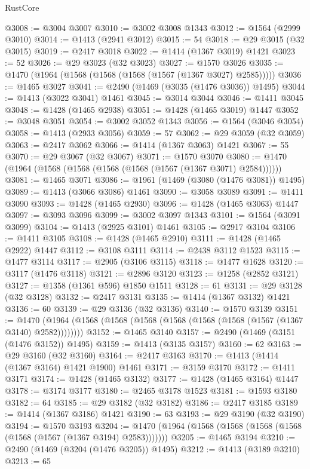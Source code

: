\begin{lexlean}{RustCore}
\begin{coremodule}
@3008 := @3004 @3007
@3010 := @3002 @3008 @1343
@3012 := @1564 (@2999 @3010)
@3014 := @1413 (@2941 @3012)
@3015 := 54
@3018 := @29 @3015 (@32 @3015)
@3019 := @2417 @3018
@3022 := @1414 (@1367 @3019) @1421
@3023 := 52
@3026 := @29 @3023 (@32 @3023)
@3027 := @1570 @3026
@3035 := @1470 (@1964 (@1568 (@1568 (@1568 (@1567 (@1367 @3027) @2585)))))
@3036 := @1465 @3027
@3041 := @2490 (@1469 (@3035 (@1476 @3036)) @1495)
@3044 := @1413 (@3022 @3041) @1461
@3045 := @3014 @3044
@3046 := @1411 @3045
@3048 := @1428 (@1465 @2938)
@3051 := @1428 (@1465 @3019) @1447
@3052 := @3048 @3051
@3054 := @3002 @3052 @1343
@3056 := @1564 (@3046 @3054)
@3058 := @1413 (@2933 @3056)
@3059 := 57
@3062 := @29 @3059 (@32 @3059)
@3063 := @2417 @3062
@3066 := @1414 (@1367 @3063) @1421
@3067 := 55
@3070 := @29 @3067 (@32 @3067)
@3071 := @1570 @3070
@3080 := @1470 (@1964 (@1568 (@1568 (@1568 (@1568 (@1567 (@1367 @3071) @2584))))))
@3081 := @1465 @3071
@3086 := @1961 (@1469 (@3080 (@1476 @3081)) @1495)
@3089 := @1413 (@3066 @3086) @1461
@3090 := @3058 @3089
@3091 := @1411 @3090
@3093 := @1428 (@1465 @2930)
@3096 := @1428 (@1465 @3063) @1447
@3097 := @3093 @3096
@3099 := @3002 @3097 @1343
@3101 := @1564 (@3091 @3099)
@3104 := @1413 (@2925 @3101) @1461
@3105 := @2917 @3104
@3106 := @1411 @3105
@3108 := @1428 (@1465 @2910)
@3111 := @1428 (@1465 @2922) @1447
@3112 := @3108 @3111
@3114 := @2438 @3112 @1523
@3115 := @1477 @3114
@3117 := @2905 (@3106 @3115)
@3118 := @1477 @1628
@3120 := @3117 (@1476 @3118)
@3121 := @2896 @3120
@3123 := @1258 (@2852 @3121)
@3127 := @1358 (@1361 @596) @1850 @1511
@3128 := 61
@3131 := @29 @3128 (@32 @3128)
@3132 := @2417 @3131
@3135 := @1414 (@1367 @3132) @1421
@3136 := 60
@3139 := @29 @3136 (@32 @3136)
@3140 := @1570 @3139
@3151 := @1470 (@1964 (@1568 (@1568 (@1568 (@1568 (@1568 (@1568 (@1567 (@1367 @3140) @2582))))))))
@3152 := @1465 @3140
@3157 := @2490 (@1469 (@3151 (@1476 @3152)) @1495)
@3159 := @1413 (@3135 @3157)
@3160 := 62
@3163 := @29 @3160 (@32 @3160)
@3164 := @2417 @3163
@3170 := @1413 (@1414 (@1367 @3164) @1421 @1900) @1461
@3171 := @3159 @3170
@3172 := @1411 @3171
@3174 := @1428 (@1465 @3132)
@3177 := @1428 (@1465 @3164) @1447
@3178 := @3174 @3177
@3180 := @2465 @3178 @1523
@3181 := @1593 @3180
@3182 := 64
@3185 := @29 @3182 (@32 @3182)
@3186 := @2417 @3185
@3189 := @1414 (@1367 @3186) @1421
@3190 := 63
@3193 := @29 @3190 (@32 @3190)
@3194 := @1570 @3193
@3204 := @1470 (@1964 (@1568 (@1568 (@1568 (@1568 (@1568 (@1567 (@1367 @3194) @2583)))))))
@3205 := @1465 @3194
@3210 := @2490 (@1469 (@3204 (@1476 @3205)) @1495)
@3212 := @1413 (@3189 @3210)
@3213 := 65

\end{coremodule}
\end{lexlean}
